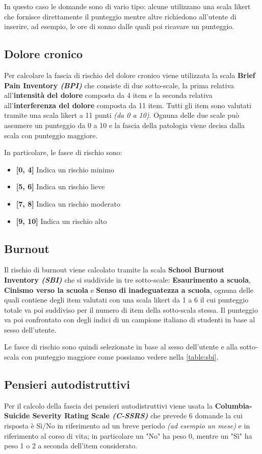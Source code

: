 In questo caso le domande sono di vario tipo: alcune utilizzano una scala likert che fornisce direttamente il punteggio mentre altre richiedono all'utente di inserire, ad esempio, le ore di sonno dalle quali poi ricavare un punteggio.

\subsection{Dolore cronico}
Per calcolare la fascia di rischio del dolore cronico viene utilizzata la scala \textbf{Brief Pain Inventory \textit{(BPI)}}\cite{BPI} che consiste di due sotto-scale, la prima relativa all'\textbf{intensità del dolore} composta da 4 item e la seconda relativa all'\textbf{interferenza del dolore} composta da 11 item. Tutti gli item sono valutati tramite una scala likert a 11 punti \textit{(da 0 a 10)}. Ognuna delle due scale può assumere un punteggio da 0 a 10 e la fascia della patologia viene decisa dalla scala con punteggio maggiore.

In particolare, le fasce di rischio sono:
\begin{itemize}
\item \textbf{[0, 4]} Indica un rischio minimo
\item \textbf{[5, 6]} Indica un rischio lieve
\item \textbf{[7, 8]} Indica un rischio moderato
\item \textbf{[9, 10]} Indica un rischio alto
\end{itemize}

\subsection{Burnout}
Il rischio di burnout viene calcolato tramite la scala \textbf{School Burnout Inventory \textit{(SBI)}}\cite{SBI} che si suddivide in tre sotto-scale: \textbf{Esaurimento a scuola}, \textbf{Cinismo verso la scuola} e  \textbf{Senso di inadeguatezza a scuola}, ognuna delle quali contiene degli item valutati con una scala likert da 1 a 6 il cui punteggio totale va poi suddiviso per il numero di item della sotto-scala stessa. Il punteggio va poi confrontato con degli indici di un campione italiano di studenti in base al sesso dell'utente.

Le fasce di rischio sono quindi selezionate in base al sesso dell'utente e alla sotto-scala con punteggio maggiore come possiamo vedere nella \autoref{table:sbi}.


\newpage
\subsection{Pensieri autodistruttivi}
Per il calcolo della fascia dei pensieri autodistruttivi viene usata la \textbf{Columbia-Suicide Severity Rating Scale \textit{(C-SSRS)}}\cite{C-SSRS} che prevede 6 domande la cui risposta è Sì/No in riferimento ad un breve periodo \textit{(ad esempio un mese)} e in riferimento al corso di vita; in particolare un "No" ha peso 0, mentre un "Sì" ha peso 1 o 2 a seconda dell'item considerato.

